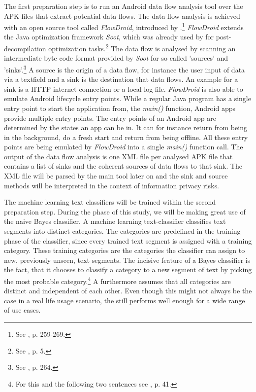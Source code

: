 The first preparation step is to run an Android data flow analysis tool over the APK files that extract potential data flows.
The data flow analysis is achieved with an open source tool called \textit{FlowDroid}, introduced by \cite{Arzt2014}.\footnote{See \cite{Arzt2014}, p. 259-269.}
\textit{FlowDroid} extends the Java optimization framework \textit{Soot}, which was already used by \cite{Enck2011} for post-decompilation optimization tasks.\footnote{See \cite{Enck2011}, p. 5.}
The data flow is analysed by scanning an intermediate byte code format provided by \textit{Soot} for so called 'sources' and 'sinks'.\footnote{See \cite{Arzt2014}, p. 264.}
A source is the origin of a data flow, for instance the user input of data via a textfield and a sink is the destination that data flows.
An example for a sink is a HTTP internet connection or a local log file.
\textit{FlowDroid} is also able to emulate Android lifecycle entry points.
While a regular Java program has a single entry point to start the application from, the \textit{main()} function, Android apps provide multiple entry points.
The entry points of an Android app are determined by the states an app can be in. 
It can for instance return from being in the background, do a fresh start and return from being offline.
All these entry points are being emulated by \textit{FlowDroid} into a single \textit{main()} function call.
The output of the data flow analysis is one XML file per analysed APK file that contains a list of sinks and the coherent sources of data flows to that sink.
The XML file will be parsed by the main \sca tool later on and the sink and source methods will be interpreted in the context of information privacy risks.

The machine learning text classifiers will be trained within the second preparation step.
During the \sca phase of this study, we will be making great use of the naive Bayes classifier.
A machine learning text-classifier classifies text segments into distinct categories. 
The categories are predefined in the training phase of the classifier, since every trained text segment is assigned with a training category.
These training categories are the categories the classifier can assign to new, previously unseen, text segments.
The incisive feature of a Bayes classifier is the fact, that it chooses to classify a category to a new segment of text by picking the most probable category.\footnote{For this and the following two sentences see \cite{Rish2001}, p. 41.}
A \nbc furthermore assumes that all categories are distinct and independent of each other. 
Even though this might not always be the case in a real life usage scenario, the \nbc still performs well enough for a wide range of use cases.

